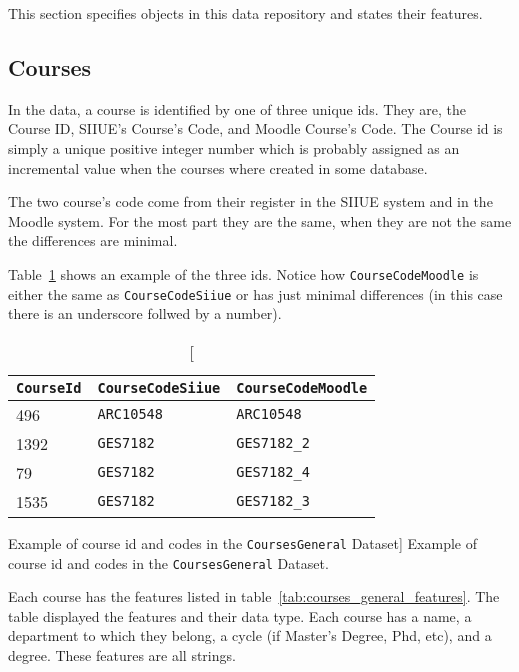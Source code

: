 This section specifies objects in this data repository and states their
features.

\subsection{Courses}
\label{sec:data_courses}

In the data, a course is identified by one of three unique ids. They are, the
Course ID, SIIUE's Course's Code, and Moodle Course's Code. The Course id is
simply a unique positive integer number which is probably assigned as an
incremental value when the courses where created in some database.

The two course's code come from their register in the SIIUE system and in the
Moodle system. For the most part they are the same, when they are not the same
the differences are minimal.

Table~\ref{tab:course_code_example} shows an example of the three ids. Notice how \texttt{CourseCodeMoodle} is either the same as \texttt{CourseCodeSiiue} or has just minimal differences (in this case there is an underscore follwed by a number).

\begin{table}[h!]
    \centering

    \begin{tabular}{l l l}
\texttt{CourseId} & \texttt{CourseCodeSiiue} & \texttt{CourseCodeMoodle} \\ \hline
        496       & \texttt{ARC10548}        & \texttt{ARC10548}         \\
        1392      & \texttt{GES7182}         & \texttt{GES7182\_2}       \\
        79        & \texttt{GES7182}         & \texttt{GES7182\_4}       \\
        1535      & \texttt{GES7182}         & \texttt{GES7182\_3}       \\
    \end{tabular}

    \caption
        [Example of course id and codes in the \texttt{CoursesGeneral} Dataset]
        {Example of course id and codes in the \texttt{CoursesGeneral} Dataset.}

    \label{tab:course_code_example}
\end{table}

Each course has the features listed in
table~\ref{tab:courses_general_features}. The table displayed the features and
their data type. Each course has a name, a department to which they belong, a
cycle (if Master's Degree, Phd, etc), and a degree. These features are all
strings.

